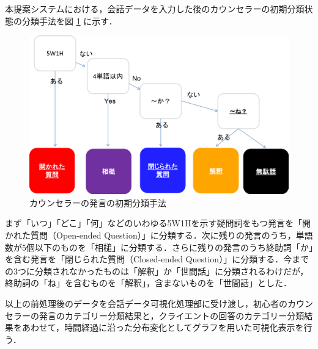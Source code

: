 \documentclass[shuuron]{kuee}
\begin{document}
本提案システムにおける，会話データを入力した後のカウンセラーの初期分類状態の分類手法を図
\ref{fig:5_2}
に示す．
\begin{figure}
  \begin{center}
    \includegraphics[width=\linewidth]{5_2.png}
  \end{center}
  \caption{カウンセラーの発言の初期分類手法}
  \label{fig:5_2}
\end{figure}
まず「いつ」「どこ」「何」などのいわゆる5W1Hを示す疑問詞をもつ発言を「開かれた質問（Open-ended Question）」に分類する．次に残りの発言のうち，単語数が5個以下のものを「相槌」に分類する．さらに残りの発言のうち終助詞「か」を含む発言を「閉じられた質問（Closed-ended Question）」に分類する．今までの3つに分類されなかったものは「解釈」か「世間話」に分類されるわけだが，終助詞の「ね」を含むものを「解釈」，含まないものを「世間話」とした．




以上の前処理後のデータを会話データ可視化処理部に受け渡し，初心者のカウンセラーの発言のカテゴリー分類結果と，クライエントの回答のカテゴリー分類結果をあわせて，時間経過に沿った分布変化としてグラフを用いた可視化表示を行う．


\end{document}
